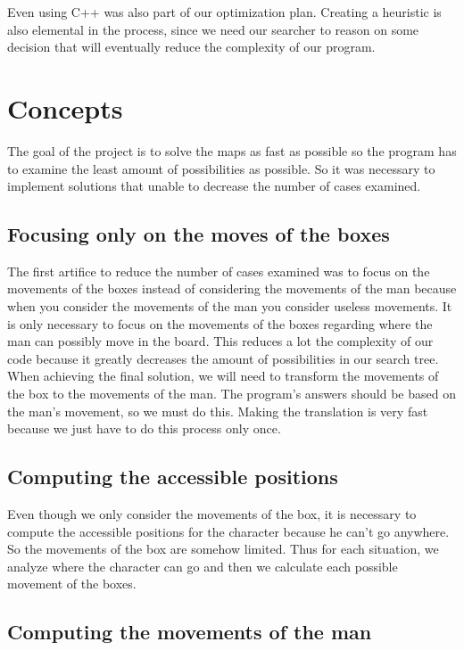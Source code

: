 \documentclass[journal]{IEEEtran}
\begin{document}
Even using C++ was also part of our optimization plan. Creating a heuristic is also elemental in the process, since we need our searcher to reason on some decision that will eventually reduce the complexity of our program.

\section{Concepts}
The goal of the project is to solve the maps as fast as possible so the program has to examine the least amount of possibilities as possible. So it was necessary to implement solutions that unable to decrease the number of cases examined.

\subsection{Focusing only on the moves of the boxes}
The first artifice to reduce the number of cases examined was to focus on the movements of the boxes instead of considering the movements of the man because when you consider the movements of the man you consider useless movements. It is only necessary to focus on the movements of the boxes regarding where the man can possibly move in the board. This reduces a lot the complexity of our code because it greatly decreases the amount of possibilities in our search tree.
When achieving the final solution, we will need to transform the movements of the box to the movements of the man. The program's answers should be based on the man's movement, so we must do this. Making the translation is very fast because we just have to do this process only once.


\subsection{Computing the accessible positions}
Even though we only consider the movements of the box, it is necessary to compute the accessible positions for the character because he can't go anywhere. So the movements of the box are somehow limited. Thus for each situation, we analyze where the character can go and then we calculate each possible movement of the boxes.

\subsection{Computing the movements of the man}
\end{document}

